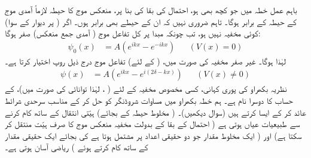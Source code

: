 باہم عمل خطہ  میں جو کچھ بھی ہو، احتمال کی بقا کی بنا پر، منعکس موج کا حیطہ لازماً آمدی موج کے حیطہ کے برابر ہوگا۔ تاہم ضروری نہیں کہ ان کے حیطے بھی برابر ہوں۔ اگر (  پر دیوار کے سوا) کوئی مخفیہ نہیں ہو، تب چونکہ مبدا پر کل تفاعل موج ( آمدی جمع منعکس) صفر ہوگا: 
\begin{align}
	\psi_0(x)& = A\left(e^{ikx}-e^{-ikx}\right)&&(V(x)=0)
\end{align}
لہٰذا  ہوگا۔ غیر صفر مخفیہ کی صورت میں، (  کے لئے) تفاعل موج درج ذیل روپ اختیار کرتا ہے۔
\begin{align}\label{مساوات_بکھراو_مخفیہ_غیر_صفر}
	\psi(x) &= A\left(e^{ikx}-e^{i(2\delta-kx)}\right)&&(V(x)\neq0)
\end{align}
نظریہ بکھراو کی پوری کہانی، کسی مخصوص مخفیہ کے لئے ( ، لہٰذا توانائی  کی صورت میں)،   کے حساب کا دوسرا نام ہے۔ ہم خطہ بکھراو  میں مساوات شروڈنگر کو حل کر کے مناسب سرحدی شرائط عائد کر کے ایسا کرتے ہیں (سوال  دیکھیں)۔ ( مخلوط حیطہ  کے بجائے) ہیّتی انتقال کے ساتھ کام کرنے سے طبیعیات عیاں ہوتی ہے ( احتمال کے بقا کے بدولت مخفیہ منعکس موج کا صرف ہیّت منتقل کر سکتا ہے) اور ( ایک مخلوط مقدار جو دو حقیقی اعداد پر مشتمل ہوتا ہے کی بجائے ایک حقیقی مقدار کے ساتھ کام کرتے ہوئے ) ریاضی آسان ہوتی ہے۔

